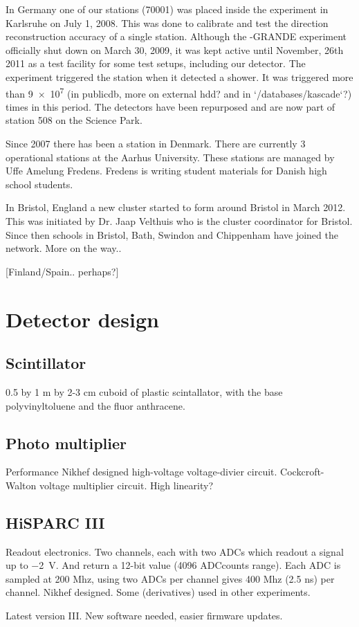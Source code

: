 In Germany one of our stations (70001) was placed inside the \kascade
experiment in Karlsruhe on July 1, 2008. This was done to calibrate and
test the direction reconstruction accuracy of a single \hisparc station.
Although the \kascade-GRANDE experiment officially shut down on March
30, 2009, it was kept active until November, 26th 2011 as a test
facility for some test setups, including our detector. The \kascade
experiment triggered the \hisparc station when it detected a shower. It
was triggered more than \num{9e7} (in publicdb, more on external hdd?
and in `/databases/kascade`?) times in this period. The detectors have
been repurposed and are now part of station 508 on the Science Park.

Since 2007 there has been a \hisparc station in
Denmark. There are currently 3 operational stations at the Aarhus
University. These stations are managed by Uffe Amelung Fredens.
Fredens is writing student materials for Danish high school students.

In Bristol, England a new cluster started to form around Bristol in
March 2012. This was initiated by Dr. Jaap Velthuis who is the cluster
coordinator for Bristol. Since then schools in Bristol, Bath, Swindon
and Chippenham have joined the network. More on the way..

[Finland/Spain.. perhaps?]


\section{Detector design}
\label{sec:detector_design}

\subsection{Scintillator}

0.5 by 1 m by 2-3 cm cuboid of plastic scintallator, with the base
polyvinyltoluene and the fluor anthracene.


\subsection{Photo multiplier}

Performance
Nikhef designed high-voltage voltage-divier circuit.
Cockcroft-Walton voltage multiplier circuit.
High linearity?


\subsection{HiSPARC III}

Readout electronics. Two channels, each with two ADCs which readout a
signal up to \SI{-2}{\volt}. And return a 12-bit value (4096 ADCcounts
range). Each ADC is sampled at 200 Mhz, using two ADCs per channel gives
400 Mhz (2.5 ns) per channel. Nikhef designed. Some (derivatives) used
in other experiments.

Latest version \hisparc III. New software needed, easier firmware updates.
